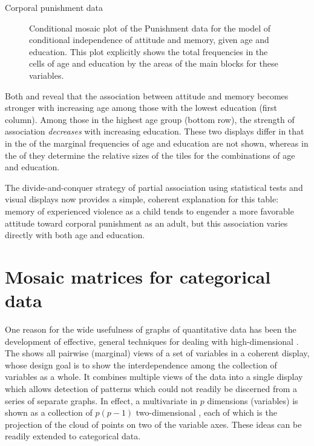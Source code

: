 \documentclass[11pt]{book}\usepackage[]{graphicx}\usepackage[]{color}
\newenvironment{knitrout}{}{} %
\renewenvironment{knitrout}{\small\renewcommand{\baselinestretch}{.85}}{} %
\begin{document}
\begin{Example}[punish]{Corporal punishment data}
\begin{knitrout}
\begin{figure}[!htb]
\caption[Conditional mosaic plot of the Punishment data for the model of conditional independence of attitude and memory, given age and education]{Conditional mosaic plot of the Punishment data for the model of conditional independence of attitude and memory, given age and education. This plot explicitly shows the total frequencies in the cells of age and education by the areas of the main blocks for these variables.\label{fig:punish-cond2}}
\end{figure}


\end{knitrout}

Both  and  reveal that the
association between attitude and memory becomes stronger with increasing age
among those with the lowest education (first column).
Among those in the highest age group (bottom row), the strength of association \emph{decreases}
with increasing education.  These two displays differ in that in the
 of  the marginal frequencies of 
age and education are not shown, whereas in the  of 
they determine the relative sizes of the tiles for the combinations of age and education.

The divide-and-conquer strategy of partial association using statistical tests and
visual displays now provides a simple, coherent explanation for this table:
memory of experienced violence as a child tends to engender a more favorable
attitude toward corporal punishment as an adult, but this association varies
directly with both age and education.
\end{Example}


\section{Mosaic matrices for categorical data}\label{sec:mosmat}

One reason for the wide usefulness of graphs of quantitative data
has been the
development of effective, general techniques for dealing with high-dimensional \Dsets.
The 
shows all pairwise (marginal) views of a set of variables
in a coherent display, whose design goal is to show the interdependence
among the collection of variables as a whole.
It combines multiple views of the data
into a single display which allows detection of patterns which could
not readily be discerned from a series of separate graphs.
In effect, a multivariate \Dset in $p$ dimensions (variables) is shown as
a collection of $p (p-1)$ two-dimensional \scats, each of which is
the projection of the cloud of points on two of the variable axes.
These ideas can be readily extended to categorical data.
\end{document}
